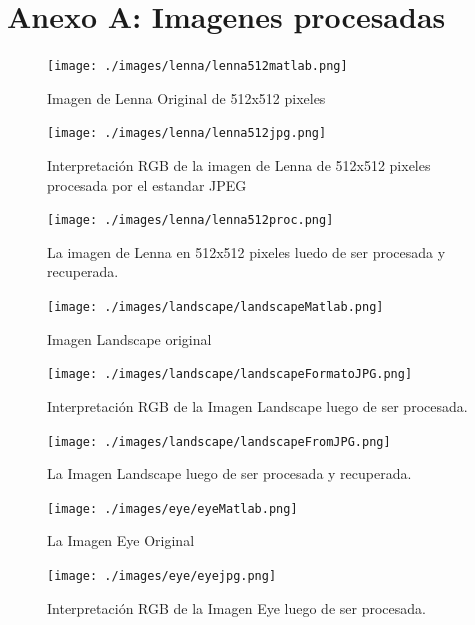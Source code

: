 \documentclass[%
	final,
	reprint,
	notitlepage,
	narroweqnarray,
	inline,
	twoside,
	invited
	]{ieee}
\begin{document}
\clearpage

\onecolumn

\section*{Anexo A: Imagenes procesadas}

\begin{figure}[H]
\centering
	\texttt{[image: ./images/lenna/lenna512matlab.png]}
	\caption{Imagen de Lenna Original de 512x512 pixeles}
\label{lenna512}
\end{figure}


\begin{figure}[H]
\centering
	\texttt{[image: ./images/lenna/lenna512jpg.png]}
	\caption{Interpretación RGB de la imagen de Lenna de 512x512 pixeles procesada por el estandar JPEG}
\label{lenna512jpg}
\end{figure}

\begin{figure}[H]
\centering
	\texttt{[image: ./images/lenna/lenna512proc.png]}
	\caption{La imagen de Lenna en 512x512 pixeles luedo de ser procesada y recuperada.}
\label{lenna512proc}
\end{figure}


\begin{figure}[H]
\centering
	\texttt{[image: ./images/landscape/landscapeMatlab.png]}
	\caption{Imagen Landscape original}
\label{landscapeOrg}
\end{figure}

\begin{figure}[H]
\centering
	\texttt{[image: ./images/landscape/landscapeFormatoJPG.png]}
	\caption{Interpretación RGB de la Imagen Landscape luego de ser procesada.}
\label{landscapeJPG}
\end{figure}

\begin{figure}[H]
\centering
	\texttt{[image: ./images/landscape/landscapeFromJPG.png]}
	\caption{La Imagen Landscape luego de ser procesada y recuperada.}
\label{landscapeFromJPG}
\end{figure}

\begin{figure}[H]
\centering
	\texttt{[image: ./images/eye/eyeMatlab.png]}
	\caption{La Imagen Eye Original}
\label{eyeOrg}
\end{figure}

\begin{figure}[H]
\centering
	\texttt{[image: ./images/eye/eyejpg.png]}
	\caption{Interpretación RGB de la Imagen Eye luego de ser procesada.}
\label{eyejpg}
\end{figure}
\end{document}
